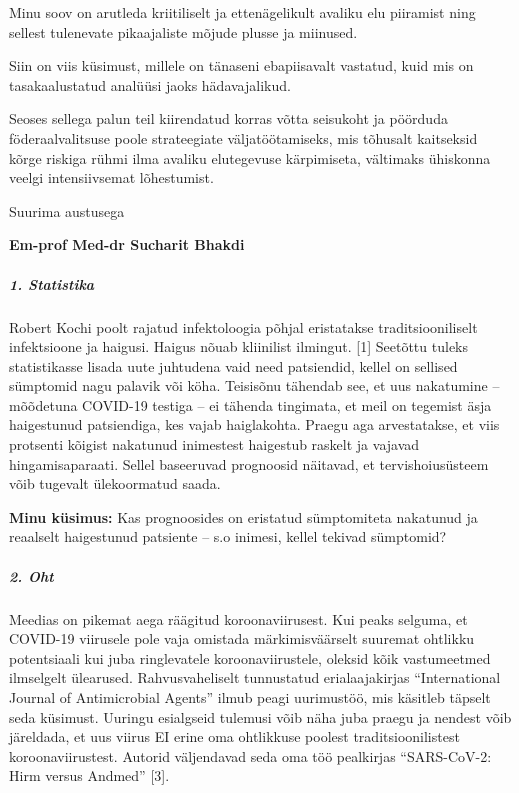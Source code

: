 Minu soov on arutleda kriitiliselt ja ettenägelikult avaliku elu
piiramist ning sellest tulenevate pikaajaliste mõjude plusse ja
miinused.

Siin on viis küsimust, millele on tänaseni ebapiisavalt vastatud, kuid
mis on tasakaalustatud analüüsi jaoks hädavajalikud.

Seoses sellega palun teil kiirendatud korras võtta seisukoht ja pöörduda
föderaalvalitsuse poole strateegiate väljatöötamiseks, mis tõhusalt
kaitseksid kõrge riskiga rühmi ilma avaliku elutegevuse kärpimiseta,
vältimaks ühiskonna veelgi intensiivsemat lõhestumist.

Suurima austusega

\textbf{Em-prof Med-dr Sucharit Bhakdi}

\hypertarget{1-statistika}{%
\subparagraph{\texorpdfstring{\textbf{1.
Statistika}}{1. Statistika}}\label{1-statistika}}

Robert Kochi poolt rajatud infektoloogia põhjal eristatakse
traditsiooniliselt infektsioone ja haigusi. Haigus nõuab kliinilist
ilmingut. {[}1{]} Seetõttu tuleks statistikasse lisada uute juhtudena
vaid need patsiendid, kellel on sellised sümptomid nagu palavik või
köha. Teisisõnu tähendab see, et uus nakatumine -- mõõdetuna COVID-19
testiga -- ei tähenda tingimata, et meil on tegemist äsja haigestunud
patsiendiga, kes vajab haiglakohta. Praegu aga arvestatakse, et viis
protsenti kõigist nakatunud inimestest haigestub raskelt ja vajavad
hingamisaparaati. Sellel baseeruvad prognoosid näitavad, et
tervishoiusüsteem võib tugevalt ülekoormatud saada.

\textbf{Minu küsimus:} Kas prognoosides on eristatud sümptomiteta
nakatunud ja reaalselt haigestunud patsiente -- s.o inimesi, kellel
tekivad sümptomid?

\hypertarget{2-oht}{%
\subparagraph{\texorpdfstring{\textbf{2. Oht}}{2. Oht}}\label{2-oht}}

Meedias on pikemat aega räägitud koroonaviirusest. Kui peaks selguma, et
COVID-19 viirusele pole vaja omistada märkimisväärselt suuremat ohtlikku
potentsiaali kui juba ringlevatele koroonaviirustele, oleksid kõik
vastumeetmed ilmselgelt ülearused. Rahvusvaheliselt tunnustatud
erialaajakirjas ``International Journal of Antimicrobial Agents'' ilmub
peagi uurimustöö, mis käsitleb täpselt seda küsimust. Uuringu esialgseid
tulemusi võib näha juba praegu ja nendest võib järeldada, et uus viirus
EI erine oma ohtlikkuse poolest traditsioonilistest koroonaviirustest.
Autorid väljendavad seda oma töö pealkirjas ``SARS-CoV-2: Hirm versus
Andmed'' {[}3{]}.

